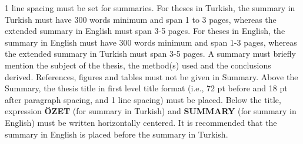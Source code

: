 1 line spacing must be set for summaries. For theses in Turkish, the summary in
Turkish must have 300 words minimum and span 1 to 3 pages, whereas the extended
summary in English must span 3-5 pages.
For theses in English, the summary in English must have 300 words minimum and
span 1-3 pages, whereas the extended summary in Turkish must span 3-5 pages.
A summary must briefly mention the subject of the thesis, the method(s) used and 
the conclusions derived.
References, figures and tables must not be given in Summary.
Above the Summary, the thesis title in first level title format 
(i.e., 72 pt before and 18 pt after paragraph spacing, and 1 line 
spacing) must be placed. Below the title, expression {\bf \"OZET} 
(for summary in Turkish) and {\bf SUMMARY} (for summary in English)
must be written horizontally centered.
It is recommended that the summary in English is placed before
the summary in Turkish.